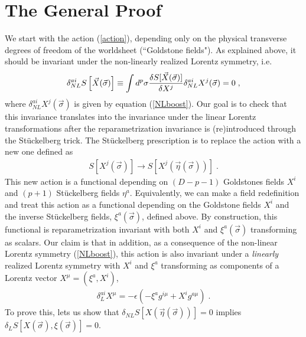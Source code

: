 \documentclass[%
 reprint,
 amsmath,amssymb,
 aps,
]{revtex4-1}
\begin{document}
\section{The General Proof}

We start with  the action (\ref{action}), depending
only on the physical transverse degrees of freedom of the worldsheet (``Goldstone fields").
As explained above, it should be invariant under the non-linearly realized Lorentz symmetry, i.e.
\begin{eqnarray}
    \delta^{a i}_{NL} S \left[ \vec{X}(\vec{\sigma}) \right]
    \equiv \int d^p \sigma
 {\delta S[ \vec{X}(\vec{\sigma}) ]\over \delta X^j}
        \delta^{a i}_{NL} X^j(\vec{\sigma}) \nonumber = 0 \; , \nonumber
\end{eqnarray}
where $\delta^{ai}_{NL} X^j(\vec{\sigma})$ is given by equation (\ref{NLboost}).
Our goal is to check that this invariance translates into the invariance under the linear Lorentz transformations after the
reparametrization invariance is (re)introduced through the St\"uckelberg trick.
The  St\"uckelberg prescription is to replace the action with a new
one defined as
\begin{eqnarray}
    S[X^j(\vec{\sigma})] \rightarrow S[X^j(\vec{\eta}(\vec{\sigma}))] \; . \nonumber
\end{eqnarray}
This new action is a functional depending on $(D-p-1)$ Goldstones fields $X^i$ and $(p+1)$ St\"uckelberg fields $\eta^a$.
Equivalently, we can make a field redefinition and treat  this action as a functional depending on  the Goldstone fields $X^i$ and
the inverse St\"uckelberg fields, $\xi^a(\vec{\sigma})$, defined above. By construction, this functional is reparametrization invariant with
both $X^i$ and $\xi^a(\vec{\sigma})$ transforming as scalars.
 Our claim is that in addition, as a consequence of the non-linear Lorentz symmetry (\ref{NLboost}), this action is also invariant under a {\it linearly} realized
 Lorentz symmetry with $X^i$ and $\xi^a$ transforming as components of a Lorentz vector $X^\mu=(\xi^a, X^i)$,
\begin{eqnarray}
\label{linearvar}
    \delta_{L}^{ai} X^{\mu} = -\epsilon (-\xi^a g^{i \mu} + X^i g^{a \mu} ) \; .
\end{eqnarray}
To prove this, lets us  show  that
$\delta_{NL} S[X(\vec{\eta}(\vec{\sigma}))] = 0$ implies $\delta_{L} S[X(\vec{\sigma}),\xi(\vec{\sigma})] = 0$.
\end{document}
